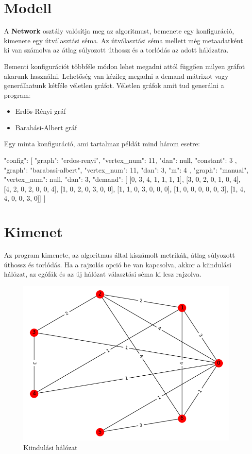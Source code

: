 \documentclass[12pt]{report}
\begin{document}
\section{Modell}

A \textbf{Network} osztály valósítja meg az algoritmust, bemenete egy konfiguráció, kimenete egy útválasztási séma.
Az útválasztási séma mellett még metaadatként ki van számolva az átlag súlyozott úthossz és a torlódás az adott hálózatra.

Bementi konfigurációt többféle módon lehet megadni attól függően milyen gráfot akarunk használni. 
Lehetőség van kézileg megadni a demand mátrixot vagy generálhatunk kétféle véletlen gráfot.
Véletlen gráfok amit tud generálni a program:
\begin{itemize}
	\item Erdős-Rényi gráf
	\item Barabási-Albert gráf
\end{itemize}

Egy minta konfiguráció, ami tartalmaz példát mind három esetre:


\begin{mintedJson}
{
  "config": [ {
	"graph": "erdos-renyi",
	"vertex_num": 11,
	"dan": null,
	"constant": 3
  }, {
	"graph": "barabasi-albert",
	"vertex_num": 11,
	"dan": 3,
	"m": 4
  }, {
	"graph": "manual",
	"vertex_num": null,
	"dan": 3,
	"demand": [
		[0, 3, 4, 1, 1, 1, 1],
		[3, 0, 2, 0, 1, 0, 4],
		[4, 2, 0, 2, 0, 0, 4],
		[1, 0, 2, 0, 3, 0, 0],
		[1, 1, 0, 3, 0, 0, 0],
		[1, 0, 0, 0, 0, 0, 3],
		[1, 4, 4, 0, 0, 3, 0]]	
	} ]
}
\end{mintedJson}

\section{Kimenet}

Az program kimenete, az algoritmus által kiszámolt metrikák, átlag súlyozott úthossz és torlódás. 
Ha a rajzolás opció be van kapcsolva, akkor a kiindulási hálózat, az egófák és az új hálózat választási séma ki lesz rajzolva.

\begin{figure}[h]
	\begin{center}
		\includegraphics[width=0.49\linewidth]{pictures/starting_network.png}
		\caption{Kiindulási hálózat}
	\end{center}
\end{figure}
\end{document}
